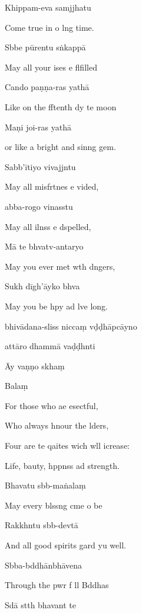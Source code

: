 Khippam-eva samjjhatu

Come true in o lng time.

Sbbe pūrentu sṅkappā

May all your ises e flfilled

Cando paṇṇa-ras yathā

Like on the fftenth dy te moon

Maṇi joi-ras yathā

or like a bright and sinng gem.

Sabb'ītiyo vivajjntu

May all misfrtnes e vided,

abba-rogo vinasstu

May all ilnss e dspelled,

Mā te bhvatv-antaryo

May you ever met wth dngers,

Sukh dīgh'āyko bhva

May you be hpy ad lve long.

bhivādana-sliss niccaṃ vḍḍhāpcāyno

attāro dhammā vaḍḍhnti

Āy vaṇṇo skhaṃ

Balaṃ

For those who ae esectful,

Who always hnour the lders,

Four are te qaites wich wll icrease:

Life, bauty, hppnss ad strength.

Bhavatu sbb-maṅalaṃ

May every blssng cme o be

Rakkhntu sbb-devtā

And all good spirits gard yu well.

Sbba-bddhānbhāvena

Through the pwr f ll Bddhas

Sdā stth bhavant te

